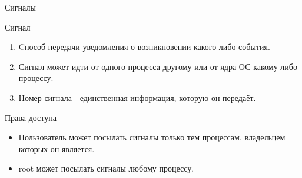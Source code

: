 \begin{frame}{Сигналы}
  \begin{block}{Сигнал}
    \begin{enumerate}
      \item Cпособ передачи уведомления о возникновении какого-либо события.
      \item Сигнал может идти от одного процесса другому или от ядра ОС какому-либо процессу.
      \item Номер сигнала - единственная информация, которую он передаёт.
    \end{enumerate}
  \end{block} \pause

  \begin{block}{Права доступа}
    \begin{itemize}
      \item Пользователь может посылать сигналы только тем процессам, владельцем которых он является.
      \item \alert{root} может посылать сигналы любому процессу.
    \end{itemize}
  \end{block}

\end{frame}
